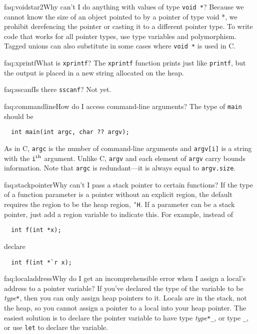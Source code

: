 \begin{faqa}{faq:voidstar2}{Why can't I do anything with values of type \texttt{void *}?}
Because we cannot know the size of an object pointed to by a pointer
of type void *, we prohibit derefencing the pointer or casting it to a
different pointer type.  To write code that works for all pointer
types, use type variables and polymorphism.  Tagged unions can also
substitute in some cases where \texttt{void *} is used in C\@.
\end{faqa}

\begin{faqa}{faq:xprintf}{What is \texttt{xprintf}?}
The \texttt{xprintf} function prints just like \texttt{printf}, but
the output is placed in a new string allocated on the heap.
\end{faqa}

\begin{faqa}{faq:sscanf}{Is there \texttt{sscanf}?}
Not yet. 
\end{faqa}

\begin{faqa}{faq:commandline}{How do I access command-line arguments?}
The type of \texttt{main} should be
\begin{verbatim}
  int main(int argc, char ?? argv);
\end{verbatim}
As in C, \texttt{argc} is the number of command-line arguments and
\texttt{argv[i]} is a string with the \texttt{i}$^{\rm th}$ argument.
Unlike C, \texttt{argv} and each element of \texttt{argv} carry bounds
information.  Note that \texttt{argc} is redundant---it is always
equal to \texttt{argv.size}.
\end{faqa}

\begin{faqa}{faq:stackpointer}{Why can't I pass a stack pointer to certain functions?}
If the type of a function parameter is a pointer without an explicit
region, the default requires the region to be the heap region,
\texttt{`H}.  If a parameter can be a stack pointer, just add a region
variable to indicate this.  For example, instead of
\begin{verbatim}
  int f(int *x);
\end{verbatim}
declare
\begin{verbatim}
  int f(int *`r x);
\end{verbatim}
\end{faqa}

\begin{faqa}{faq:localaddress}{Why do I get an incomprehensible error when I assign a local's address to a pointer variable?}
If you've declared the type of the variable to be
\textit{type}\texttt{*}, then you can only assign heap pointers to it.
Locals are in the stack, not the heap, so you cannot assign a pointer
to a local into your heap pointer.  The easiest solution is to declare
the pointer variable to have type \textit{type}\texttt{*_}, or type
\texttt{_}, or use \texttt{let} to declare the variable.
\end{faqa}

